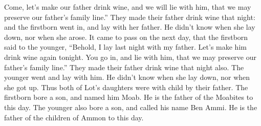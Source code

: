 {Come, let’s make our father drink wine, and we will lie with him, that we may preserve our father’s family line.”
They made their father drink wine that night: and the firstborn went in, and lay with her father. He didn’t know when she lay down, nor when she arose.
It came to pass on the next day, that the firstborn said to the younger, “Behold, I lay last night with my father. Let’s make him drink wine again tonight. You go in, and lie with him, that we may preserve our father’s family line.”
They made their father drink wine that night also. The younger went and lay with him. He didn’t know when she lay down, nor when she got up.
Thus both of Lot’s daughters were with child by their father.
The firstborn bore a son, and named him Moab. He is the father of the Moabites to this day.
The younger also bore a son, and called his name Ben Ammi. He is the father of the children of Ammon to this day.

}
